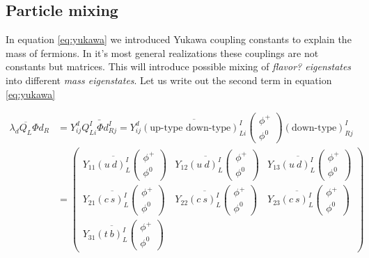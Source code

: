 \subsection{Particle mixing}
In equation \ref{eq:yukawa} we introduced Yukawa coupling constants to explain the mass of fermions. In it's most general realizations these couplings are not constants but matrices. This will introduce possible mixing of \textit{flavor? eigenstates} into different \textit{mass eigenstates}. Let us write out the second term in equation \ref{eq:yukawa}

\begin{equation}
\begin{split}
\lambda_d \overline{Q_L} \Phi d_R &= Y^d_{ij}\bar{Q^I_{Li} \Phi d^I_{Rj}} = Y^d_{ij}\overline{\left(\textrm{up-type down-type}\right)^I_{Li}} \begin{pmatrix} \phi^+ \\ \phi^0 \end{pmatrix}  \left(\textrm{down-type}\right)^I_{Rj} \\
&= \begin{pmatrix} 
Y_{11}\overline{\left(u \ d\right)^I_L}\begin{pmatrix} \phi^+ \\ \phi^0 \end{pmatrix} &
Y_{12}\overline{\left(u \ d\right)^I_L}\begin{pmatrix} \phi^+ \\ \phi^0 \end{pmatrix} &
Y_{13}\overline{\left(u \ d\right)^I_L}\begin{pmatrix} \phi^+ \\ \phi^0 \end{pmatrix}\\  
Y_{21}\overline{\left(c \ s\right)^I_L}\begin{pmatrix} \phi^+ \\ \phi^0 \end{pmatrix} &
Y_{22}\overline{\left(c \ s\right)^I_L}\begin{pmatrix} \phi^+ \\ \phi^0 \end{pmatrix} &
Y_{23}\overline{\left(c \ s\right)^I_L}\begin{pmatrix} \phi^+ \\ \phi^0 \end{pmatrix}\\
Y_{31}\overline{\left(t \ b\right)^I_L}\begin{pmatrix} \phi^+ \\ \phi^0 \end{pmatrix} &

\end{pmatrix}
\end{split}
\end{equation}

